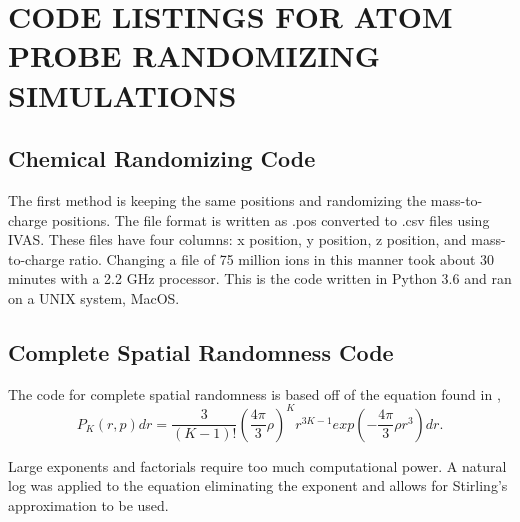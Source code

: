 \chapter{CODE LISTINGS FOR ATOM PROBE RANDOMIZING SIMULATIONS}

\section*{Chemical Randomizing Code}

	The first method is keeping the same positions and randomizing the mass-to-charge positions. The file format is written as .pos converted to .csv files using IVAS. These files have four columns: x position, y position, z position, and mass-to-charge ratio. Changing a file of 75 million ions in this manner took about 30 minutes with a 2.2 GHz processor. This is the code written in Python 3.6 and ran on a UNIX system, MacOS.


{
	
}


\section*{Complete Spatial Randomness Code}

The code for complete spatial randomness is based off of the equation found in \cite{RN1114},
\begin{equation}
\label{isoappeq1}
 P_{K}(r,p)dr = \dfrac{3}{(K-1)!}\left(\dfrac{4\pi}{3}\rho\right)^{K}r^{3K-1}exp\left(-\dfrac{4\pi}{3}\rho r^{3}\right)dr. 
\end{equation}

Large exponents and factorials require too much computational power. A natural log was applied to the equation eliminating the exponent and allows for Stirling’s approximation to be used.

{
		
}